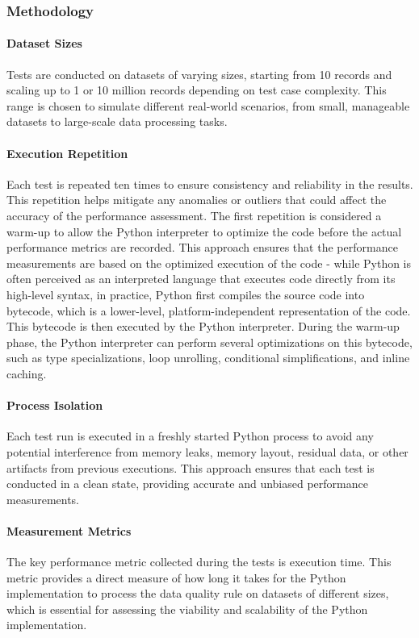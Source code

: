 \subsubsection{Methodology}

\paragraph{Dataset Sizes} Tests are conducted on datasets of varying sizes, starting from 10 records and scaling up to 1 or 10 million records depending on test case complexity. This range is chosen to simulate different real-world scenarios, from small, manageable datasets to large-scale data processing tasks.

\paragraph{Execution Repetition} Each test is repeated ten times to ensure consistency and reliability in the results. This repetition helps mitigate any anomalies or outliers that could affect the accuracy of the performance assessment.
The first repetition is considered a warm-up to allow the Python interpreter to optimize the code before the actual performance metrics are recorded. This approach ensures that the performance measurements are based on the optimized execution of the code - while Python is often perceived as an interpreted language that executes code directly from its high-level syntax, in practice, Python first compiles the source code into bytecode, which is a lower-level, platform-independent representation of the code. This bytecode is then executed by the Python interpreter. During the warm-up phase, the Python interpreter can perform several optimizations on this bytecode, such as type specializations, loop unrolling, conditional simplifications, and inline caching. 

\paragraph{Process Isolation} Each test run is executed in a freshly started Python process to avoid any potential interference from memory leaks, memory layout, residual data, or other artifacts from previous executions. This approach ensures that each test is conducted in a clean state, providing accurate and unbiased performance measurements.

\paragraph{Measurement Metrics} The key performance metric collected during the tests is execution time. This metric provides a direct measure of how long it takes for the Python implementation to process the data quality rule on datasets of different sizes, which is essential for assessing the viability and scalability of the Python implementation.


